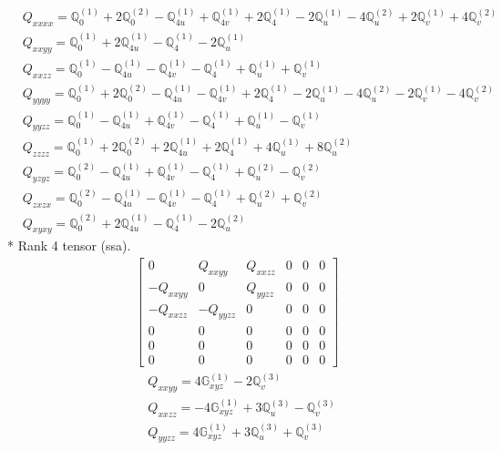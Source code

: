 \documentclass[fleqn,8pt,landscape]{jsarticle}
\begin{document}
\begin{align*}
& Q_{xxxx} = \mathbb{Q}_{0}^{(1)} + 2 \mathbb{Q}_{0}^{(2)} - \mathbb{Q}_{4u}^{(1)} + \mathbb{Q}_{4v}^{(1)} + 2 \mathbb{Q}_{4}^{(1)} - 2 \mathbb{Q}_{u}^{(1)} - 4 \mathbb{Q}_{u}^{(2)} + 2 \mathbb{Q}_{v}^{(1)} + 4 \mathbb{Q}_{v}^{(2)} \\
& Q_{xxyy} = \mathbb{Q}_{0}^{(1)} + 2 \mathbb{Q}_{4u}^{(1)} - \mathbb{Q}_{4}^{(1)} - 2 \mathbb{Q}_{u}^{(1)} \\
& Q_{xxzz} = \mathbb{Q}_{0}^{(1)} - \mathbb{Q}_{4u}^{(1)} - \mathbb{Q}_{4v}^{(1)} - \mathbb{Q}_{4}^{(1)} + \mathbb{Q}_{u}^{(1)} + \mathbb{Q}_{v}^{(1)} \\
& Q_{yyyy} = \mathbb{Q}_{0}^{(1)} + 2 \mathbb{Q}_{0}^{(2)} - \mathbb{Q}_{4u}^{(1)} - \mathbb{Q}_{4v}^{(1)} + 2 \mathbb{Q}_{4}^{(1)} - 2 \mathbb{Q}_{u}^{(1)} - 4 \mathbb{Q}_{u}^{(2)} - 2 \mathbb{Q}_{v}^{(1)} - 4 \mathbb{Q}_{v}^{(2)} \\
& Q_{yyzz} = \mathbb{Q}_{0}^{(1)} - \mathbb{Q}_{4u}^{(1)} + \mathbb{Q}_{4v}^{(1)} - \mathbb{Q}_{4}^{(1)} + \mathbb{Q}_{u}^{(1)} - \mathbb{Q}_{v}^{(1)} \\
& Q_{zzzz} = \mathbb{Q}_{0}^{(1)} + 2 \mathbb{Q}_{0}^{(2)} + 2 \mathbb{Q}_{4u}^{(1)} + 2 \mathbb{Q}_{4}^{(1)} + 4 \mathbb{Q}_{u}^{(1)} + 8 \mathbb{Q}_{u}^{(2)} \\
& Q_{yzyz} = \mathbb{Q}_{0}^{(2)} - \mathbb{Q}_{4u}^{(1)} + \mathbb{Q}_{4v}^{(1)} - \mathbb{Q}_{4}^{(1)} + \mathbb{Q}_{u}^{(2)} - \mathbb{Q}_{v}^{(2)} \\
& Q_{zxzx} = \mathbb{Q}_{0}^{(2)} - \mathbb{Q}_{4u}^{(1)} - \mathbb{Q}_{4v}^{(1)} - \mathbb{Q}_{4}^{(1)} + \mathbb{Q}_{u}^{(2)} + \mathbb{Q}_{v}^{(2)} \\
& Q_{xyxy} = \mathbb{Q}_{0}^{(2)} + 2 \mathbb{Q}_{4u}^{(1)} - \mathbb{Q}_{4}^{(1)} - 2 \mathbb{Q}_{u}^{(2)}
\end{align*}
* Rank 4 tensor (ssa).
\begin{align*}
\begin{bmatrix} 0 & Q_{xxyy} & Q_{xxzz} & 0 & 0 & 0 \\ - Q_{xxyy} & 0 & Q_{yyzz} & 0 & 0 & 0 \\ - Q_{xxzz} & - Q_{yyzz} & 0 & 0 & 0 & 0 \\ 0 & 0 & 0 & 0 & 0 & 0 \\ 0 & 0 & 0 & 0 & 0 & 0 \\ 0 & 0 & 0 & 0 & 0 & 0 \end{bmatrix}
\end{align*}
\begin{align*}
& Q_{xxyy} = 4 \mathbb{G}_{xyz}^{(1)} - 2 \mathbb{Q}_{v}^{(3)} \\
& Q_{xxzz} = - 4 \mathbb{G}_{xyz}^{(1)} + 3 \mathbb{Q}_{u}^{(3)} - \mathbb{Q}_{v}^{(3)} \\
& Q_{yyzz} = 4 \mathbb{G}_{xyz}^{(1)} + 3 \mathbb{Q}_{u}^{(3)} + \mathbb{Q}_{v}^{(3)}
\end{align*}
\end{document}
